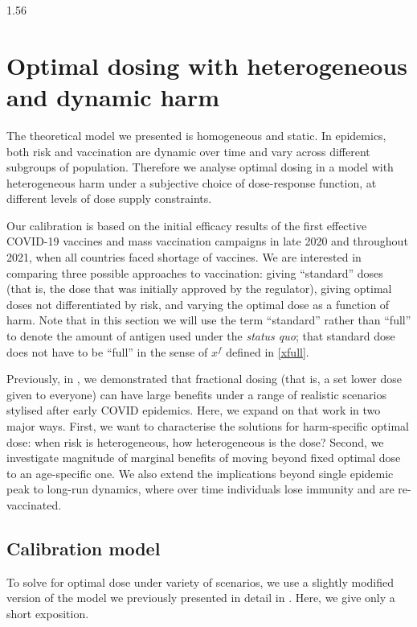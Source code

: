 \documentclass[12pt]{article}
\newcommand{\xfull}{x^{f\!}}
\begin{document}
\begin{spacing}{1.56}
\pagebreak

\section{Optimal dosing with heterogeneous and dynamic harm}

The theoretical model we presented is homogeneous and static. In epidemics, both risk and vaccination are dynamic over time and vary across different subgroups of population. Therefore we analyse optimal dosing in a model with heterogeneous harm under a subjective choice of dose-response function, at different levels of dose supply constraints. 

Our calibration is based on the initial efficacy results of the first effective COVID-19 vaccines and mass vaccination campaigns in late 2020 and throughout 2021, when all countries faced shortage of vaccines. We are interested in comparing three possible approaches to vaccination: giving ``standard'' doses (that is, the dose that was initially approved by the regulator), giving optimal doses not differentiated by risk, and varying the optimal dose as a function of harm. Note that in this section we will use the term ``standard'' rather than ``full'' to denote the amount of antigen used under the {\em status quo}; that standard dose does not have to be ``full'' in the sense of $\xfull$ defined in \eqref{xfull}.

Previously, in \cite{wiecek2021}, we demonstrated that fractional dosing (that is, a set lower dose given to everyone) can have large benefits under a range of realistic scenarios stylised after early COVID epidemics. Here, we expand on that work in two major ways. First, we want to characterise the solutions for harm-specific optimal dose: when risk is heterogeneous, how heterogeneous is the dose? Second, we investigate magnitude of marginal benefits of moving beyond fixed optimal dose to an age-specific one. We also extend the implications beyond single epidemic peak to long-run dynamics, where over time individuals lose immunity and are re-vaccinated.




\subsection{Calibration model}
To solve for optimal dose under variety of scenarios, we use a slightly modified version of the model we previously presented in detail in \cite{wiecek_2021}. Here, we give only a short exposition. 


\end{spacing}
\end{document}
